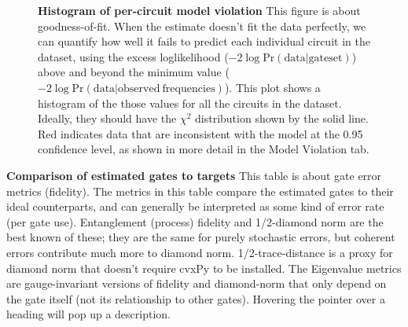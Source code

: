 \documentclass{article}[11pt]
\newcommand{\putfield}[2]{#2}
\begin{document}
\begin{figure}
  \begin{center}
    \begin{adjustbox}{max width=\textwidth}
      \putfield{bestEstimateColorHistogram}{}
    \end{adjustbox}
    \caption{\textbf{Histogram of per-circuit model violation} This figure is about goodness-of-fit.  When the estimate doesn't fit the data perfectly, we can quantify how well it fails to predict each individual circuit in the dataset, using the excess loglikelihood ($-2\log\mathrm{Pr}(\mathrm{data}|\mathrm{gateset})$) above and beyond the minimum value ($-2 \log \mathrm{Pr}(\mathrm{data}|\mathrm{observed\ frequencies})$).  This plot shows a histogram of the those values for all the circuits in the dataset.  Ideally, they should have the $\chi^2$ distribution shown by the solid line.  Red indicates data that are inconsistent with the model at the 0.95 confidence level, as shown in more detail in the Model Violation tab.}
  \end{center}
\end{figure}


\begin{table}
  \begin{center}
    \begin{adjustbox}{max width=\textwidth}
      \putfield{bestGatesVsTargetTable_sum}{}
    \end{adjustbox}    
    \caption{\textbf{Comparison of estimated gates to targets} This table is about gate error metrics (fidelity). The metrics in this table compare the estimated gates to their ideal counterparts, and can generally be interpreted as some kind of error rate (per gate use).  Entanglement (process) fidelity and 1/2-diamond norm are the best known of these; they are the same for purely stochastic errors, but coherent errors contribute much more to diamond norm.  1/2-trace-distance is a proxy for diamond norm that doesn't require cvxPy to be installed.  The Eigenvalue metrics are gauge-invariant versions of fidelity and diamond-norm that only depend on the gate itself (not its relationship to other gates).  Hovering the pointer over a heading will pop up a description.}
  \end{center}
\end{table}
\end{document}
